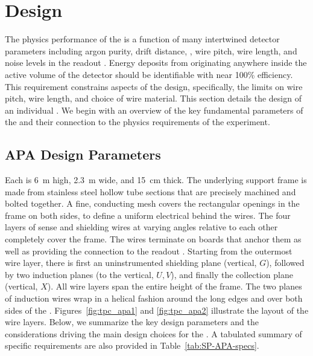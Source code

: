 \section{Design}
\label{sec:fdsp-apa-design}

The physics performance of the  is a function of many intertwined detector parameters including argon purity, drift distance, \efield, wire pitch, wire length, and noise levels in the readout .  Energy deposits from  originating anywhere inside the active volume of the detector should be identifiable with near \num{100}\% efficiency.  This requirement constrains aspects of the  design, specifically, the limits on wire pitch, wire length, and choice of wire material.  This section details the design of an individual . We begin with an overview of the key fundamental parameters of the  and their connection to the physics requirements of the experiment. 


\subsection{APA Design Parameters}
\label{sec:fdsp-apa-design-overview}

Each  is \SI{6}{m} high, \SI{2.3}{m} wide, and \SI{15}{cm} thick.  The underlying support frame is made from stainless steel hollow tube sections that are precisely machined and bolted together. A fine, conducting mesh covers the rectangular openings in the frame on both sides, to define a uniform electrical  behind the wires. The four layers of sense and shielding wires at varying angles relative to each other completely cover the frame. The wires terminate on boards that anchor them as well as providing the connection to the  readout . Starting from the outermost wire layer, there is first an uninstrumented shielding plane (vertical, $G$), followed by two induction planes (\apainducwireangle to the vertical, $U,V$), and finally the collection plane (vertical, $X$). All wire layers span the entire height of the  frame. The two planes of induction wires wrap in a helical fashion around the long edges and over both sides of the . Figures~\ref{fig:tpc_apa1} and \ref{fig:tpc_apa2} illustrate the layout of the wire layers.  Below, we summarize the key design parameters and the considerations driving the main design choices for the .  A tabulated summary of  specific requirements are also provided in Table~\ref{tab:SP-APA-specs}. %

